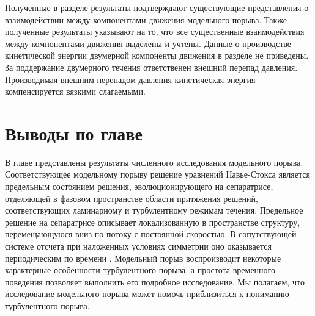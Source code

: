 Полученные в разделе результаты подтверждают существующие представления о взаимодействии между компонентами движения модельного порыва. Также полученные результаты указывают на то, что все существенные взаимодействия между компонентами движения выделены и учтены. Данные о производстве кинетической энергии двумерной компоненты движения в разделе не приведены. За поддержание двумерного течения ответственен внешний перепад давления. Производимая внешним перепадом давления кинетическая энергия компенсируется вязкими слагаемыми. 



\section{Выводы по главе}

В главе представлены результаты численного исследования модельного порыва. Соответствующее модельному порыву решение уравнений Навье-Стокса является предельным состоянием решения, эволюционирующего на сепаратрисе, отделяющей в фазовом пространстве области притяжения решений, соответствующих ламинарному и турбулентному режимам течения. Предельное решение на сепаратрисе описывает локализованную в пространстве структуру, перемещающуюся вниз по потоку с постоянной скоростью. В сопутствующей системе отсчета при наложенных условиях симметрии оно оказывается периодическим по времени \cite{Avila2013}. Модельный порыв воспроизводит некоторые характерные особенности турбулентного порыва, а простота временного поведения позволяет выполнить его подробное исследование. Мы полагаем, что исследование модельного порыва может помочь приблизиться к пониманию турбулентного порыва.

